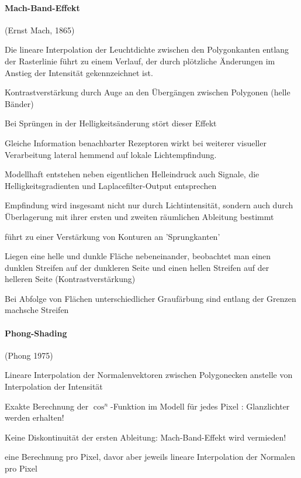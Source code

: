 \documentclass[landscape]{article}
\begin{document}
\begin{multicols}{3}
  \paragraph{Mach-Band-Effekt}
  (Ernst Mach, 1865)
  
  Die lineare Interpolation der Leuchtdichte zwischen den Polygonkanten entlang der Rasterlinie führt zu einem Verlauf, der durch plötzliche Änderungen im Anstieg der Intensität gekennzeichnet ist.
  \begin{itemize*}
    \item Kontrastverstärkung durch Auge an den Übergängen zwischen Polygonen (helle Bänder)
    \item Bei Sprüngen in der Helligkeitsänderung stört dieser Effekt
    \item Gleiche Information benachbarter Rezeptoren wirkt bei weiterer visueller Verarbeitung lateral hemmend auf lokale Lichtempfindung.
    \item Modellhaft entstehen neben eigentlichen Helleindruck auch Signale, die Helligkeitsgradienten und Laplacefilter-Output entsprechen
    \item Empfindung wird insgesamt nicht nur durch Lichtintensität, sondern auch durch Überlagerung mit ihrer ersten und zweiten räumlichen Ableitung bestimmt
    \item führt zu einer Verstärkung von Konturen an 'Sprungkanten'
    \item Liegen eine helle und dunkle Fläche nebeneinander, beobachtet man einen dunklen Streifen auf der dunkleren Seite und einen hellen Streifen auf der helleren Seite (Kontrastverstärkung)
    \item Bei Abfolge von Flächen unterschiedlicher Graufärbung sind entlang der Grenzen machsche Streifen
  \end{itemize*}
  
  \paragraph{Phong-Shading}
  (Phong 1975)
  \begin{itemize*}
    \item Lineare Interpolation der Normalenvektoren zwischen Polygonecken anstelle von Interpolation der Intensität
    \item Exakte Berechnung der $\cos^n$-Funktion im Modell für jedes Pixel : Glanzlichter werden erhalten!
    \item Keine Diskontinuität der ersten Ableitung: Mach-Band-Effekt wird vermieden!
    \item eine Berechnung pro Pixel, davor aber jeweils lineare Interpolation der Normalen pro Pixel
  \end{itemize*}
  

\end{multicols}
\end{document}
